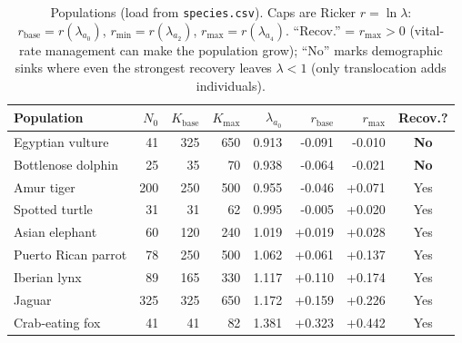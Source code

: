 \documentclass[11pt]{article}
\newcommand{\rbase}{r_{\mathrm{base}}}
\newcommand{\Kbase}{K_{\mathrm{base}}}
\newcommand{\rmax}{r_{\max}}
\newcommand{\rmin}{r_{\min}}
\newcommand{\Kmax}{K_{\max}}
\newcommand{\code}[1]{\texttt{#1}}
\begin{document}
\begin{table}[h]\centering\footnotesize
\caption{Populations (load from \code{species.csv}). Caps are Ricker
$r=\ln\lambda$: $\rbase{=}r(\lambda_{a_0})$, $\rmin{=}r(\lambda_{a_2})$,
$\rmax{=}r(\lambda_{a_4})$. ``Recov.'' = $\rmax>0$ (vital-rate management can make
the population grow); ``No'' marks demographic sinks where even the strongest
recovery leaves $\lambda<1$ (only translocation adds individuals).}
\label{tab:pop}
\begin{tabular}{@{}l r r r r r r c@{}}
\toprule
Population & $N_0$ & $\Kbase$ & $\Kmax$ & $\lambda_{a_0}$ & $\rbase$ & $\rmax$ & Recov.? \\
\midrule

Egyptian vulture & 41 & 325 & 650 & 0.913 & -0.091 & -0.010 & \textbf{No} \\
Bottlenose dolphin & 25 & 35 & 70 & 0.938 & -0.064 & -0.021 & \textbf{No} \\
Amur tiger & 200 & 250 & 500 & 0.955 & -0.046 & +0.071 & Yes \\
Spotted turtle & 31 & 31 & 62 & 0.995 & -0.005 & +0.020 & Yes \\
Asian elephant & 60 & 120 & 240 & 1.019 & +0.019 & +0.028 & Yes \\
Puerto Rican parrot & 78 & 250 & 500 & 1.062 & +0.061 & +0.137 & Yes \\
Iberian lynx & 89 & 165 & 330 & 1.117 & +0.110 & +0.174 & Yes \\
Jaguar & 325 & 325 & 650 & 1.172 & +0.159 & +0.226 & Yes \\
Crab-eating fox & 41 & 41 & 82 & 1.381 & +0.323 & +0.442 & Yes \\
\bottomrule
\end{tabular}
\end{table}
\end{document}
